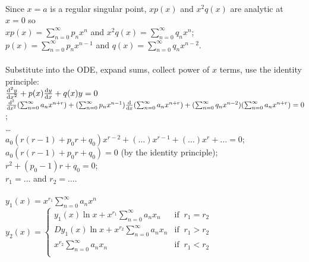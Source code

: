 \documentclass{article}
\begin{document}
				\\
				Since $x = a$ is a regular singular point, $xp(x)$ and $x^2q(x)$ are analytic at $x=0$ so \\
				$xp(x) = \sum_{n=0}^\infty{p_nx^n}$ and $x^2q(x) = \sum_{n=0}^\infty{q_nx^n}$; \\
				$p(x) = \sum_{n=0}^\infty{p_nx^{n-1}}$ and $q(x) = \sum_{n=0}^\infty{q_nx^{n-2}}$. \\
				\\
				Substitute into the ODE, expand sums, collect power of $x$ terms, use the identity principle: \\
				$\dv[2]{y}{x} + p(x)\dv{y}{x} + q(x)y = 0$ \\
				$\dv[2]{x}(\sum_{n=0}^\infty{a_nx^{n+r}}) + (\sum_{n=0}^\infty{p_nx^{n-1}})\dv{x}(\sum_{n=0}^\infty{a_nx^{n+r}}) + (\sum_{n=0}^\infty{q_nx^{n-2}})(\sum_{n=0}^\infty{a_nx^{n+r}}) = 0$; \\
				\ldots \\
				$a_0(r(r-1) + p_0r + q_0)x^{r-2} + (\ldots)x^{r-1} + (\ldots)x^{r} + \ldots  = 0$; \\
				$a_0(r(r-1) + p_0r + q_0) = 0$ (by the identity principle); \\
				$r^2 + (p_0 - 1)r + q_0 = 0$; \\
				$r_1 = \ldots$ and $r_2 = \ldots$. \\
				\\
				$y_1(x) = x^{r_1}\sum_{n=0}^\infty{a_nx^n}$ \\
				$y_2(x) =	\begin{cases}
								y_1(x)\ln{x} + x^{r_1}\sum_{n=0}^\infty{a_nx_n}		& \text{if}\;\; r_1 = r_2 \\
								Dy_1(x)\ln{x} + x^{r_2}\sum_{n=0}^\infty{a_nx_n}	& \text{if}\;\; r_1 > r_2 \\
								x^{r_2}\sum_{n=0}^\infty{a_nx_n}					& \text{if}\;\; r_1 < r_2 \\
							\end{cases}$
\end{document}
